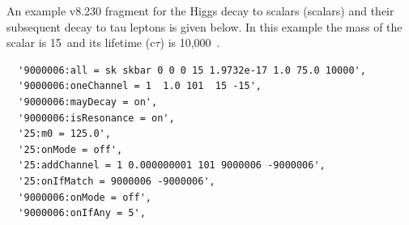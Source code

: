 An example \PYTHIA v8.230 fragment for the Higgs decay to scalars (scalars) and their subsequent decay to tau leptons is given below.
In this example the mass of the scalar is 15~\GeV and its lifetime ($\mathrm{c}\tau$) is 10,000~\mm.
\begin{verbatim}
  '9000006:all = sk skbar 0 0 0 15 1.9732e-17 1.0 75.0 10000',
  '9000006:oneChannel = 1  1.0 101  15 -15',
  '9000006:mayDecay = on',
  '9000006:isResonance = on',
  '25:m0 = 125.0',
  '25:onMode = off',
  '25:addChannel = 1 0.000000001 101 9000006 -9000006',
  '25:onIfMatch = 9000006 -9000006',
  '9000006:onMode = off',
  '9000006:onIfAny = 5',
\end{verbatim}


%
%
%
%
%
